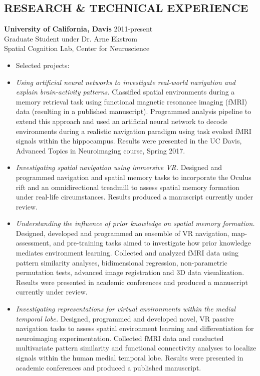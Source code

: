 \documentclass[line,margin,10pt]{res}
\begin{document}
\begin{resume}
\section{RESEARCH \& TECHNICAL EXPERIENCE} 
\textbf{University of California, Davis} \hfill 2011-present \\
Graduate Student under Dr. Arne Ekstrom\\
Spatial Cognition Lab, Center for Neuroscience
\begin{itemize} \itemsep -2pt
\item  []Selected projects:
\item \emph{Using artificial neural networks to investigate real-world navigation and explain brain-activity patterns.} Classified spatial environments during a memory retrieval task using functional magnetic resonance imaging (fMRI) data (resulting in a published manuscript). Programmed analysis pipeline to extend this approach and used an artificial neural network to decode environments during a realistic navigation paradigm using task evoked fMRI signals within the hippocampus. Results were presented in the UC Davis, Advanced Topics in Neuroimaging course, Spring 2017.
\item \emph{Investigating spatial navigation using immersive VR.} Designed and programmed navigation and spatial memory tasks to incorporate the Oculus rift and an omnidirectional treadmill to assess spatial memory formation under real-life circumstances. Results produced a manuscript currently under review. 
\item \emph{Understanding the influence of prior knowledge on spatial memory formation.} Designed, developed and programmed an ensemble of VR navigation, map-assessment, and pre-training tasks aimed to investigate how prior knowledge mediates environment learning. Collected and analyzed fMRI data using pattern similarity analyses, bidimensional regression, non-parametric permutation tests, advanced image registration and 3D data visualization. Results were presented in academic conferences and produced a manuscript currently under review.
\item \emph{Investigating representations for virtual environments within the medial temporal lobe.} Designed, programmed and developed novel, VR passive navigation tasks to assess spatial environment learning and differentiation for neuroimaging experimentation. Collected fMRI data and conducted multivariate pattern similarity and functional connectivity analyses to localize signals within the human medial temporal lobe. Results were presented in academic conferences and produced a published manuscript.
\end{itemize} 


\end{resume}
\end{document}
